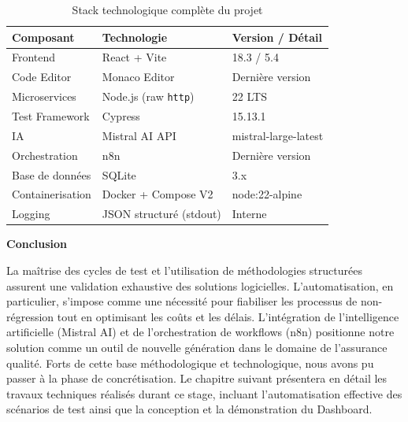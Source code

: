 \begin{table}[H]
\centering
\caption{Stack technologique complète du projet}
\renewcommand{\arraystretch}{1.3}
\begin{tabularx}{\textwidth}{l l X}
\toprule
\textbf{Composant} & \textbf{Technologie} & \textbf{Version / Détail} \\
\midrule
\rowcolor{primary!5} Frontend & React + Vite & 18.3 / 5.4 \\
Code Editor & Monaco Editor & Dernière version \\
\rowcolor{primary!5} Microservices & Node.js (raw \texttt{http}) & 22 LTS \\
Test Framework & Cypress & 15.13.1 \\
\rowcolor{primary!5} IA & Mistral AI API & mistral-large-latest \\
Orchestration & n8n & Dernière version \\
\rowcolor{primary!5} Base de données & SQLite & 3.x \\
Containerisation & Docker + Compose V2 & node:22-alpine \\
\rowcolor{primary!5} Logging & JSON structuré (stdout) & Interne \\
\bottomrule
\end{tabularx}
\end{table}


\vspace{10pt}
\textbf{Conclusion}

La maîtrise des cycles de test et l'utilisation de méthodologies structurées assurent une validation exhaustive des solutions logicielles. L'automatisation, en particulier, s'impose comme une nécessité pour fiabiliser les processus de non-régression tout en optimisant les coûts et les délais. L'intégration de l'intelligence artificielle (Mistral AI) et de l'orchestration de workflows (n8n) positionne notre solution comme un outil de nouvelle génération dans le domaine de l'assurance qualité. Forts de cette base méthodologique et technologique, nous avons pu passer à la phase de concrétisation. Le chapitre suivant présentera en détail les travaux techniques réalisés durant ce stage, incluant l'automatisation effective des scénarios de test ainsi que la conception et la démonstration du Dashboard.
